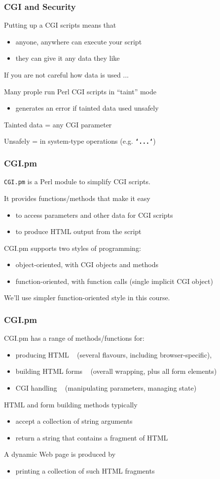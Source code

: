 \begin{frame}
\frametitle{CGI and Security}
Putting up a CGI scripts means that
\begin{itemize}
\item  anyone, anywhere can execute your script
\item  they can give it any data they like
\end{itemize}
If you are not careful how data is used ...

Many prople run Perl CGI scripts in ``taint'' mode
\begin{itemize}
\item  generates an error if tainted data used unsafely
\end{itemize}
Tainted data = any CGI parameter

Unsafely = in system-type operations (e.g. \textbf{\tt{`...`}})
\end{frame}

\begin{frame}
\frametitle{CGI.pm}
{\tt CGI.pm} is a Perl module to simplify CGI scripts.

It provides functions/methods that make it easy
\begin{itemize}
\item  to access parameters and other data for CGI scripts
\item  to produce HTML output from the script
\end{itemize}
CGI.pm supports two styles of programming:

\begin{itemize}
\item  object-oriented, with CGI objects and methods 
\item  function-oriented, with function calls (single implicit CGI object)
\end{itemize}

We'll use simpler function-oriented style in this course.
\end{frame}

\begin{frame}
\frametitle{CGI.pm}
CGI.pm has a range of methods/functions for:
\begin{itemize}
\item  producing HTML ~ {\small (several flavours, including browser-specific)},
\item  building HTML forms ~ {\small (overall wrapping, plus all form elements)}
\item  CGI handling ~ {\small (manipulating parameters, managing state)}
\end{itemize}
HTML and form building methods typically
\begin{itemize}
\item  accept a collection of string arguments
\item  return a string that contains a fragment of HTML
\end{itemize}

A dynamic Web page is produced by
\begin{itemize}
\item  printing a collection of such HTML fragments
\end{itemize}
\end{frame}

